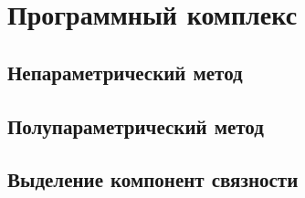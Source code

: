 \chapter{Программный комплекс}

\section{Непараметрический метод}

\section{Полупараметрический метод}

\section{Выделение компонент связности}






